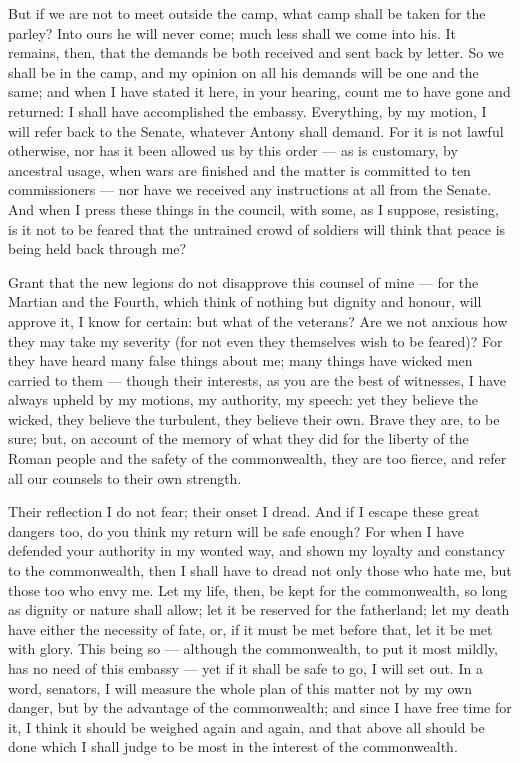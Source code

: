  But if we are not to meet outside the camp, what camp shall be taken for the parley? Into ours he will never come; much less shall we come into his. It remains, then, that the demands be both received and sent back by letter. So we shall be in the camp, and my opinion on all his demands will be one and the same; and when I have stated it here, in your hearing, count me to have gone and returned: I shall have accomplished the embassy. Everything, by my motion, I will refer back to the Senate, whatever Antony shall demand. For it is not lawful otherwise, nor has it been allowed us by this order --- as is customary, by ancestral usage, when wars are finished and the matter is committed to ten commissioners --- nor have we received any instructions at all from the Senate. And when I press these things in the council, with some, as I suppose, resisting, is it not to be feared that the untrained crowd of soldiers will think that peace is being held back through me?

 Grant that the new legions do not disapprove this counsel of mine --- for the Martian and the Fourth, which think of nothing but dignity and honour, will approve it, I know for certain: but what of the veterans? Are we not anxious how they may take my severity (for not even they themselves wish to be feared)? For they have heard many false things about me; many things have wicked men carried to them --- though their interests, as you are the best of witnesses, I have always upheld by my motions, my authority, my speech: yet they believe the wicked, they believe the turbulent, they believe their own. Brave they are, to be sure; but, on account of the memory of what they did for the liberty of the Roman people and the safety of the commonwealth, they are too fierce, and refer all our counsels to their own strength.

 Their reflection I do not fear; their onset I dread. And if I escape these great dangers too, do you think my return will be safe enough? For when I have defended your authority in my wonted way, and shown my loyalty and constancy to the commonwealth, then I shall have to dread not only those who hate me, but those too who envy me. Let my life, then, be kept for the commonwealth, so long as dignity or nature shall allow; let it be reserved for the fatherland; let my death have either the necessity of fate, or, if it must be met before that, let it be met with glory. This being so --- although the commonwealth, to put it most mildly, has no need of this embassy --- yet if it shall be safe to go, I will set out. In a word, senators, I will measure the whole plan of this matter not by my own danger, but by the advantage of the commonwealth; and since I have free time for it, I think it should be weighed again and again, and that above all should be done which I shall judge to be most in the interest of the commonwealth.
